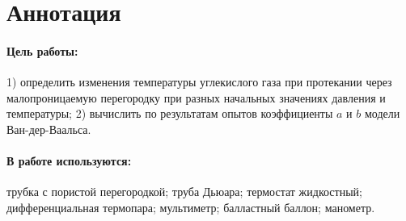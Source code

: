 \documentclass[a4paper,12pt]{report}
\begin{document}
	
	\newpage
    \pagestyle{fancy}

    \fancyhead{}
    \fancyfoot{}
    \fancyhead[L]{\rightmark}
    \fancyhead[R]{\thepage}

    \section*{Аннотация}
        \paragraph*{Цель работы:} 1) определить изменения температуры углекислого газа при протекании через малопроницаемую перегородку при разных начальных значениях давления и температуры; 2) вычислить по результатам опытов коэффициенты $a$ и $b$ модели Ван-дер-Ваальса.
        \paragraph*{В работе используются:} трубка с пористой перегородкой; труба Дьюара; термостат жидкостный; дифференциальная термопара; мультиметр; балластный баллон; манометр.
    \vspace{0.5cm}
\end{document}
